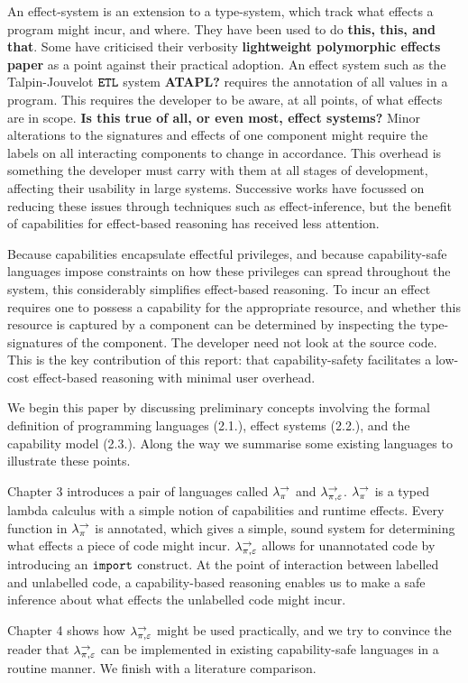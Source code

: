 An effect-system is an extension to a type-system, which track what effects a program might incur, and where. They have been used to do \textbf{this, this, and that}. Some have criticised their verbosity \textbf{lightweight polymorphic effects paper} as a point against their practical adoption. An effect system such as the Talpin-Jouvelot $\mathtt{ETL}$ system \textbf{ATAPL?} requires the annotation of all values in a program. This requires the developer to be aware, at all points, of what effects are in scope. \textbf{Is this true of all, or even most, effect systems?} Minor alterations to the signatures and effects of one component might require the labels on all interacting components to change in accordance. This overhead is something the developer must carry with them at all stages of development, affecting their usability in large systems. Successive works have focussed on reducing these issues through techniques such as effect-inference, but the benefit of capabilities for effect-based reasoning has received less attention.

Because capabilities encapsulate effectful privileges, and because capability-safe languages impose constraints on how these privileges can spread throughout the system, this considerably simplifies effect-based reasoning. To incur an effect requires one to possess a capability for the appropriate resource, and whether this resource is captured by a component can be determined by inspecting the type-signatures of the component. The developer need not look at the source code. This is the key contribution of this report: that capability-safety facilitates a low-cost effect-based reasoning with minimal user overhead.

We begin this paper by discussing preliminary concepts involving the formal definition of programming languages (2.1.), effect systems (2.2.), and the capability model (2.3.). Along the way we summarise some existing languages to illustrate these points.

Chapter 3 introduces a pair of languages called $\lambda^{\rightarrow}_{\pi}$ and $\lambda^{\rightarrow}_{\pi, \varepsilon}$. $\lambda^{\rightarrow}_{\pi}$ is a typed lambda calculus with a simple notion of capabilities and runtime effects. Every function in $\lambda^{\rightarrow}_{\pi}$ is annotated, which gives a simple, sound system for determining what effects a piece of code might incur. $\lambda^{\rightarrow}_{\pi, \varepsilon}$ allows for unannotated code by introducing an $\mathtt{import}$ construct. At the point of interaction between labelled and unlabelled code, a capability-based reasoning enables us to make a safe inference about what effects the unlabelled code might incur.

Chapter 4 shows how $\lambda^{\rightarrow}_{\pi, \varepsilon}$ might be used practically, and we try to convince the reader that $\lambda^{\rightarrow}_{\pi, \varepsilon}$ can be implemented in existing capability-safe languages in a routine manner. We finish with a literature comparison.
